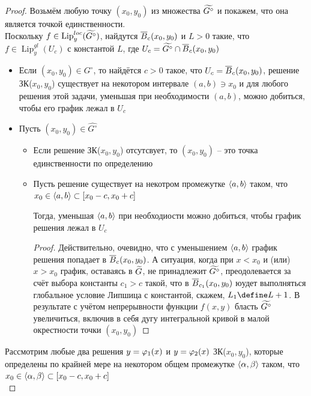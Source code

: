 \begin{proof}
    Возьмём любую точку $ (x_0, y_0) $ из множества $ \widetilde{G^\circ} $ и покажем, что она является точкой единственности. \\
    Поскольку $ f \in \operatorname{Lip}_y^{loc}(\widetilde{G^\circ}) $, найдутся $ \overline{B}_c(x_0, y_0) $ и $ L > 0 $ такие, что $ f \in \operatorname{Lip}_y^{gl}(U_c) $ с константой $ L $, где $ U_c = \widetilde{G^\circ} \cap \overline{B}_c(x_0, y_0) $
    \begin{itemize}
        \item Если $ (x_0, y_0) \in G^\circ $, то найдётся $ c > 0 $ такое, что $ U_c = \overline{B}_c(x_0, y_0) $, решение ЗК($ x_0, y_0 $) существует на некотором интервале $ (a, b) \ni x_0 $ и для любого решения этой задачи, уменьшая при необходимости $ (a, b) $, можно добиться, чтобы его график лежал в $ U_c $
        \item Пусть $ (x_0, y_0) \in \hat{G^\circ} $
        \begin{itemize}
            \item Если решение ЗК($ x_0, y_0 $) отсутсвует, то $ (x_0, y_0) $ -- это точка единственности по определению
            \item Пусть решение существует на некотром промежутке $ \Braket{a, b} $ таком, что $ x_0 \in \Braket{a, b} \subset [x_0 - c, x_0 + c] $
            \begin{statement}
                Тогда, уменьшая $ \Braket{a, b} $ при необходиости можно добиться, чтобы график решения лежал в $ U_c $
            \end{statement}
            \begin{proof}
                Действительно, очевидно, что с уменьшением $ \Braket{a, b} $ график решения попадает в $ \overline{B}_c(x_0, y_0) $. А ситуация, когда при $ x < x_0 $ и (или) $ x > x_0 $ график, оставаясь в $ \widetilde{G} $, не принадлежит $ \widetilde{G^\circ} $, преодолевается за счёт выбора константы $ c_1 > c $ такой, что в $ \overline{B}_{c_1}(x_0, y_0) $ юудет выполняться глобальное условие Липшица с константой, скажем, $ L_1 \define L + 1 $. В результате с учётом непрерывности функции $ f(x, y) $ бласть $ \widetilde{G^\circ} $ увеличиться, включив в себя дугу интегральной кривой в малой окрестности точки $ (x_0, y_0) $
            \end{proof}
        \end{itemize}
    \end{itemize}
    Рассмотрим любые два решения $ y = \varphi_1(x) $ и $ y = \varphi_2(x) $ ЗК($ x_0, y_0 $), которые определены по крайней мере на некотором общем промежутке $ \Braket{\alpha, \beta} $ таком, что $ x_0 \in \Braket{\alpha, \beta} \subset [x_0 - c, x_0 + c] $ \\

\end{proof}
